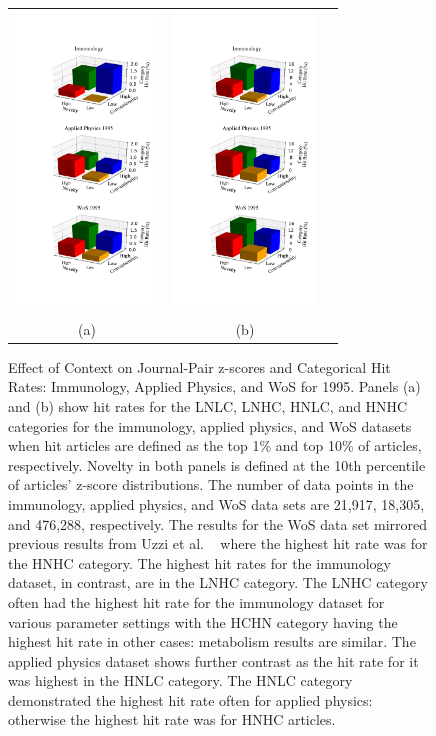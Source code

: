 \documentclass[NETN]{stjour}
\begin{document}
\begin{figure}
\centering
\begin{tabular}{ccc}
\includegraphics[width=1.5in]{Fig2H01N10.pdf} & \includegraphics[width=1.5in]{Fig2H10N10.pdf} \\
(a) & (b) \\
\end{tabular}
\caption{Effect of Context on Journal-Pair z-scores and Categorical Hit Rates: Immunology, Applied Physics, and WoS for 1995. Panels (a) and (b) show hit rates for the LNLC, LNHC, HNLC, and HNHC categories for the immunology, applied physics, and WoS datasets when hit articles are defined as the top 1\% and top 10\% of articles, respectively.  Novelty in both panels is defined at the 10th percentile of articles' z-score distributions. The number of data points in the immunology, applied physics, and WoS data sets are 21,917, 18,305, and 476,288, respectively.  The results for the WoS data set mirrored previous results from Uzzi et al. ~\cite{uzzi_atypical_2013} where the highest hit rate was for the HNHC category.  The highest hit rates for the immunology dataset, in contrast, are in the LNHC category. The LNHC category often had the highest hit rate for the immunology dataset for various parameter settings with the HCHN category having the highest hit rate in other cases: metabolism results are similar. The applied physics dataset shows further contrast as the hit rate for it was highest in the HNLC category.  The HNLC category demonstrated the highest hit rate often for applied physics: otherwise the highest hit rate was for HNHC articles.}
\label{fig:Fig2}
\end{figure}
\end{document}
